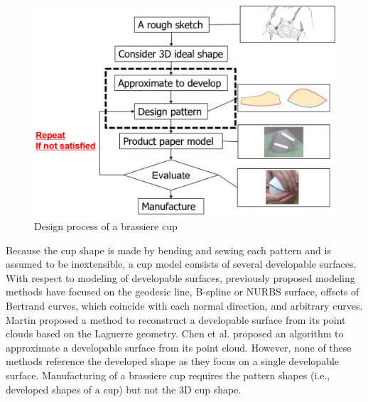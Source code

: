 \documentclass[E]{scitrans}
\begin{document}
\begin{figure}[h!]
	\centering
	\includegraphics[width= 1.0 \columnwidth]{./figure/DesignProcess2.eps}
	\caption{Design process of a brassiere cup}
	\label{fig:process}
\end{figure}

Because the cup shape is made by bending and sewing each pattern and is assumed to be inextensible, a cup model consists of several developable surfaces. With respect to modeling of developable surfaces, previously proposed modeling methods have focused on the geodesic line\cite{c2}, B-spline or NURBS surface\cite{c3,c4}, offsets of Bertrand curves, which coincide with each normal direction\cite{c5,c6}, and arbitrary curves\cite{c7}. Martin proposed a method to reconstruct a developable surface from its point clouds based on the Laguerre geometry\cite{c8}. Chen et al. proposed an algorithm to approximate a developable surface from its point cloud\cite{c9}. However, none of these methods reference the developed shape as they focus on a single developable surface. Manufacturing of a brassiere cup requires the pattern shapes (i.e., developed shapes of a cup) but not the 3D cup shape.

\end{document}
